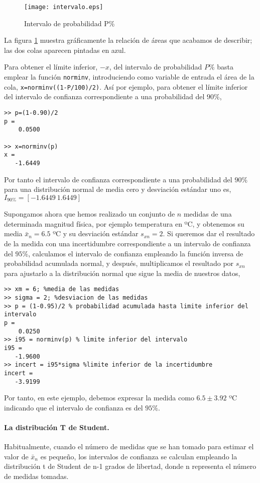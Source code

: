 \begin{figure}[h]
\centering
\texttt{[image: intervalo.eps]}
\caption{Intervalo de probabilidad P\%}
\label{fig:intervalo}
\end{figure}
La figura \ref{fig:intervalo} muestra gráficamente la relación de áreas que acabamos de describir; las dos colas aparecen pintadas en azul. 


Para obtener el límite inferior, $-x$, del intervalo de probabilidad $P\%$ basta emplear la función \texttt{norminv}, introduciendo como variable de entrada el área de la cola, \texttt{x=norminv((1-P/100)/2)}. Así por ejemplo, para obtener el límite inferior del intervalo de confianza correspondiente a una probabilidad del $90\%$,

\begin{verbatim}
>> p=(1-0.90)/2
p =
    0.0500

>> x=norminv(p)
x =
   -1.6449
\end{verbatim}

Por tanto el intervalo de confianza correspondiente a una probabilidad del $90\%$ para una distribución normal de media cero y desviación estándar uno es, $I_{90\%} =[-1.6449\ 1.6449]$

Supongamos ahora que hemos realizado un conjunto de $n$ medidas de una determinada magnitud física, por ejemplo temperatura en ºC, y obtenemos su media $\bar{x}_n=6.5$ ºC y su desviación estándar $s_{xn}=2$. Si queremos dar el resultado de la medida con una incertidumbre correspondiente a un intervalo de confianza del $95\%$, calculamos el intervalo de confianza empleando la función inversa de probabilidad acumulada normal, y después, multiplicamos el resultado por $s_{xn}$ para ajustarlo a la distribución normal que sigue la media de nuestros datos, 

\begin{verbatim}
>> xm = 6; %media de las medidas
>> sigma = 2; %desviacion de las medidas
>> p = (1-0.95)/2 % probabilidad acumulada hasta limite inferior del intervalo
p =
    0.0250
>> i95 = norminv(p) % limite inferior del intervalo
i95 =
   -1.9600 
>> incert = i95*sigma %limite inferior de la incertidumbre
incert =
   -3.9199
\end{verbatim}

Por tanto, en este ejemplo, debemos expresar la medida como $6.5 \pm 3.92$ ºC indicando que el intervalo de confianza es del $95\%$.

\paragraph{La distribución T de Student.} Habitualmente, cuando el número de medidas que se han tomado para estimar el valor de $\bar{x}_n$ es pequeño, los intervalos de confianza se calculan empleando la distribución t de Student de n-1 grados de libertad, donde  n representa el número de medidas tomadas.

